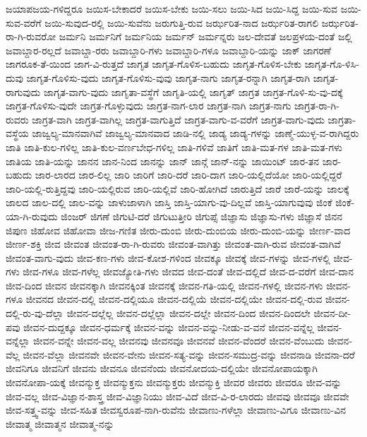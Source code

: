 {ಜಯಾಪಜಯ-ಗಳಿದ್ದರೂ
ಜಯಿಸ-ಬೇಕಾದರೆ
ಜಯಿಸ-ಬೇಕು
ಜಯಿ-ಸಲು
ಜಯಿ-ಸಿದ
ಜಯಿ-ಸಿದ್ದ
ಜಯಿ-ಸುವ
ಜಯಿ-ಸುವ-ವರೆಗೆ
ಜಯಿ-ಸುವುದ-ರಲ್ಲಿ
ಜಯಿ-ಸುವೆನು
ಜರುಗುತ್ತಿ-ರುವ
ಜರ್ಝರಿತ-ನಾದ
ಜರ್ಝರಿತ-ರಾಗಲಿ
ಜರ್ಝರಿತ-ರಾ-ಗಿ-ರುವರೋ
ಜರ್ಮನಿ
ಜರ್ಮನಿಗೆ
ಜರ್ಮನಿಯ
ಜರ್ಮನ್
ಜರ್ಮನ್ನರು
ಜಲ-ದೇವತೆ
ಜಲಪ್ರಳಯ-ದಂತೆ
ಜಲ್ಲಿ
ಜವಾಬ್ದಾರ-ರಲ್ಲದೆ
ಜವಾಬ್ದಾ-ರರು
ಜವಾಬ್ದಾರಿ-ಗಳು
ಜವಾಬ್ದಾರಿ-ಗಳೂ
ಜವಾಬ್ದಾರಿ-ಯನ್ನು
ಜಾಕ್
ಜಾಗರಣೆ
ಜಾಗರೂಕ-ತೆ-ಯಿಂದ
ಜಾಗ-ವಿ-ರುತ್ತದೆ
ಜಾಗೃತ
ಜಾಗೃತ-ಗೊಳಿಸ-ಬಹುದು
ಜಾಗೃತ-ಗೊಳಿಸ-ಬೇಕು
ಜಾಗೃತ-ಗೊ-ಳಿಸಿ-ದುವು
ಜಾಗೃತ-ಗೊಳಿಸು-ವುದು
ಜಾಗೃತ-ಗೊಳಿಸು-ವುವು
ಜಾಗೃತ-ನಾಗು
ಜಾಗೃತ-ರನ್ನಾಗಿ
ಜಾಗೃತ-ರಾಗಿ
ಜಾಗೃತ-ರಾಗುವುದು
ಜಾಗೃತ-ವಾಗು-ವುದು
ಜಾಗೃತಾ-ವಸ್ಥೆಗೆ
ಜಾಗೃತಿ-ಯಲ್ಲಿ
ಜಾಗೃತ್
ಜಾಗ್ರತ
ಜಾಗ್ರತ-ಗೊಳಿ-ಸು-ವು-ದಕ್ಕೆ
ಜಾಗ್ರತ-ಗೊಳಿಸು-ವುದೇ
ಜಾಗ್ರತ-ಗೊಳ್ಳುವುದು
ಜಾಗ್ರತ-ನಾಗ-ಲಾರ
ಜಾಗ್ರತ-ನಾಗಿ
ಜಾಗ್ರತ-ನಾಗು
ಜಾಗ್ರತ-ರಾ-ಗಿ-ರುವರು
ಜಾಗ್ರತ-ವಾಗಿ
ಜಾಗ್ರತ-ವಾಗಿಲ್ಲ
ಜಾಗ್ರತ-ವಾಗುತ್ತಿದೆ
ಜಾಗ್ರತ-ವಾಗು-ವ-ವರೆಗೆ
ಜಾಗ್ರತ-ವಾಗು-ವುದು
ಜಾಗ್ರತಾ-ವಸ್ಥೆಯ
ಜಾಜ್ವಲ್ಯ-ಮಾನವಾಗಿವೆ
ಜಾಜ್ವಲ್ಯ-ಮಾನವಾದ
ಜಾಡಿ-ನಲ್ಲಿ
ಜಾಡ್ಯ
ಜಾಡ್ಯ-ಗಳನ್ನು
ಜಾಣ್ಮೆ-ಯುಳ್ಳ-ವ-ರಾಗಿದ್ದರು
ಜಾತಿ
ಜಾತಿ-ಕುಲ-ಗಳಿಲ್ಲ
ಜಾತಿ-ಕುಲ-ವರ್ಣಬೇಧ-ಗಳಿಲ್ಲ
ಜಾತಿ-ಗಳಿವೆ
ಜಾತಿಗೆ
ಜಾತಿ-ಮತ-ಗಳ
ಜಾತಿ-ಮತ-ಗಳು
ಜಾತಿಯ
ಜಾತಿ-ಯನ್ನು
ಜಾನನ
ಜಾನ-ನಿಂದ
ಜಾನನ್ನು
ಜಾನ್
ಜಾನ್ಗೆ
ಜಾನ್-ನನ್ನು
ಜಾಯಿಂಟ್
ಜಾರ-ತನ
ಜಾರ-ಬಹುದು
ಜಾರ-ಲಾರದ
ಜಾರ-ಲಿಲ್ಲ
ಜಾರಿ
ಜಾರಿಗೆ
ಜಾರಿ-ದರೆ
ಜಾರಿ-ದಾಗ
ಜಾರಿ-ಯಲ್ಲಿದೆಯೋ
ಜಾರಿ-ಯಲ್ಲಿದ್ದರೆ
ಜಾರಿ-ಯಲ್ಲಿ-ರುತ್ತಿದ್ದವು
ಜಾರಿ-ಯಲ್ಲಿರುವ
ಜಾರಿ-ಯಲ್ಲಿವೆ
ಜಾರಿ-ಹೋಗಿದೆ
ಜಾರುತ್ತಿದೆ
ಜಾರೆ
ಜಾರೆ-ಯನ್ನು
ಜಾಲಕ್ಕೆ
ಜಾಲದ
ಜಾಲ-ದಲ್ಲಿ
ಜಾಲ-ವನ್ನು
ಜಾಳುಜಾಳಾಗಿ
ಜಾಸ್ತಿ
ಜಾಸ್ತಿ-ಯಾಗು-ವು-ದಿಲ್ಲವೆ
ಜಾಸ್ತಿ-ಯಾಗುವುವು
ಜಿಂಕೆ
ಜಿಂಕೆ-ಯಾ-ಗಿ-ರುವುದು
ಜಿಂಜರ್
ಜಿಗಣೆ
ಜಿಗುಟಿ-ದರೆ
ಜಿಗುಟುತ್ತೀರಿ
ಜಿಗುಪ್ಸೆ
ಜಿಜ್ಞಾಸು
ಜಿಜ್ಞಾಸು-ಗಳು
ಜಿಜ್ಞಾಸೆ
ಜಿನನ
ಜಿಪುಣ
ಜಿಹೋವ
ಜಿಹೋವಾ
ಜೀಜ-ಗಣಿತ
ಜೀರು-ದುಂಬಿ
ಜೀರು-ದುಂಬಿಯ
ಜೀರು-ದುಂಬಿ-ಯನ್ನು
ಜೀರ್ಣ-ವಾದ
ಜೀರ್ಣ-ಶಕ್ತಿ
ಜೀವ
ಜೀವಂತ
ಜೀವಂತ-ರಾ-ಗಿ-ರುವರು
ಜೀವಂತ-ವಾಗಿತ್ತು
ಜೀವಂತ-ವಾಗಿ-ರುವ
ಜೀವಂತ-ವಾಗಿವೆ
ಜೀವಂತ-ವಾಗು-ವುದು
ಜೀವ-ಕಣ-ಗಳು
ಜೀವ-ಕೋಶ-ಗಳಿಂದ
ಜೀವಕ್ಕೂ
ಜೀವಕ್ಕೆ
ಜೀವ-ಗಳನ್ನು
ಜೀವ-ಗಳಲ್ಲಿ
ಜೀವ-ಗಳು
ಜೀವ-ಗಳೂ
ಜೀವ-ಗಳೆಲ್ಲ
ಜೀವಜ್ಯೋತಿ-ಗಳು
ಜೀವದ
ಜೀವ-ದಂತೆ
ಜೀವ-ದಲ್ಲಿದೆ
ಜೀವ-ದ-ವರೆಗೆ
ಜೀವ-ದಾನ
ಜೀವ-ದಿಂದ
ಜೀವನ
ಜೀವನಕ್ಕಾಗಿ
ಜೀವನಕ್ಕಿಂತ
ಜೀವನಕ್ಕೆ
ಜೀವನ-ಗತಿ-ಯಲ್ಲಿ
ಜೀವನ-ಗಳಲ್ಲಿ
ಜೀವನ-ಗಳು
ಜೀವನ-ಗಳೂ
ಜೀವನದ
ಜೀವನ-ದಲ್ಲಿ
ಜೀವನ-ದಲ್ಲಿಯೂ
ಜೀವನ-ದಲ್ಲಿಯೆ
ಜೀವನ-ದಲ್ಲಿಯೇ
ಜೀವನ-ದಲ್ಲಿ-ರುವ
ಜೀವನ-ದಲ್ಲಿ-ರು-ವು-ದೆಲ್ಲಾ
ಜೀವನ-ದಲ್ಲೆಲ್ಲ
ಜೀವನ-ದಲ್ಲೆಲ್ಲಾ
ಜೀವನ-ದಲ್ಲೇ
ಜೀವನ-ದಿಂದ
ಜೀವನ-ದಿಂದಲೇ
ಜೀವನ-ದೀ-ಪವು
ಜೀವನ-ದುದ್ದಕ್ಕೂ
ಜೀವನ-ಧರ್ಮಕ್ಕೆ
ಜೀವನ-ವನ್ನು
ಜೀವನ-ವನ್ನು-ನೀಡು-ವ-ವನೆ
ಜೀವನ-ವನ್ನೆಲ್ಲ
ಜೀವನ-ವನ್ನೆಲ್ಲಾ
ಜೀವನ-ವನ್ನೇ
ಜೀವನ-ವಲ್ಲ
ಜೀವನವು
ಜೀವನವೂ
ಜೀವನವೆ
ಜೀವನ-ವೆಂದರೆ
ಜೀವನ-ವೆಂಬುದು
ಜೀವನ-ವೆಲ್ಲ
ಜೀವನ-ವೆಲ್ಲಾ
ಜೀವನವೇ
ಜೀವನ-ವೇನು
ಜೀವನ-ಸತ್ಯ-ವನ್ನು
ಜೀವನ-ಸಮುದ್ರ-ವನ್ನು
ಜೀವನಾಡಿ
ಜೀವನಾ-ದರೆ
ಜೀವನಿಗೂ
ಜೀವನಿಗೆ
ಜೀವನು
ಜೀವನೂ
ಜೀವನೆಂದು
ಜೀವನೋದಯ-ದಲ್ಲಿಯೇ
ಜೀವನೋಪಾಯಕ್ಕಾಗಿ
ಜೀವನೋಪಾ-ಯಕ್ಕೆ
ಜೀವನ್ಮುಕ್ತ
ಜೀವನ್ಮುಕ್ತನು
ಜೀವನ್ಮುಕ್ತರು
ಜೀವನ್ಮುಕ್ತಿ
ಜೀವರ
ಜೀವರು
ಜೀವರೂ
ಜೀವ-ವನ್ನು
ಜೀವ-ವಲ್ಲ
ಜೀವ-ವಿಜ್ಞಾನ-ಶಾಸ್ತ್ರ
ಜೀವ-ವಿಜ್ಞಾನಿಯು
ಜೀವ-ವಿದೆ
ಜೀವ-ವಿ-ರ-ಲಾರದು
ಜೀವವು
ಜೀವವೂ
ಜೀವವೇ
ಜೀವ-ಸತ್ತ್ವ-ವನ್ನು
ಜೀವ-ಸಹಿತ
ಜೀವಸ್ವರೂಪ-ನಾಗಿ-ರುವೆನು
ಜೀವಾಣು-ಗಳೆಲ್ಲಾ
ಜೀವಾಣು-ವಿಗೂ
ಜೀವಾಣು-ವಿನ
ಜೀವಾತ್ಮ
ಜೀವಾತ್ಮನ
ಜೀವಾತ್ಮ-ನನ್ನು
}
